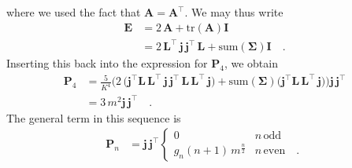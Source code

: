\documentclass[modern]{aastex62}
\begin{document}
    where we used the fact that $\mathbf{A} = \mathbf{A}^\top$. We may thus write
    \begin{align}
        \mathbf{E} & =
        2 \, \mathbf{A} + \mathrm{tr}(\mathbf{A}) \mathbf{I}
        \nonumber      \\
                   & =
        2 \, \mathbf{L}^\top \, \mathbf{j} \, \mathbf{j}^\top \, \mathbf{L} + \mathrm{sum}(\pmb{\Sigma}) \mathbf{I}
        \quad.
    \end{align}
    Inserting this back into the expression for $\mathbf{P}_4$, we obtain
    \begin{align}
        \mathbf{P}_4 & =
        \frac{5}{K^4}
        \bigg(
        2 \, \big(\mathbf{j}^\top \mathbf{L} \, \mathbf{L}^\top \, \mathbf{j} \, \mathbf{j}^\top \, \mathbf{L} \, \mathbf{L}^\top \, \mathbf{j} \big)
        +
        \mathrm{sum}(\pmb{\Sigma}) \big(\mathbf{j}^\top \mathbf{L} \, \mathbf{L}^\top \, \mathbf{j} \big)
        \bigg) \mathbf{j} \, \mathbf{j}^\top
        \nonumber        \\
                     & =
        3 \, m^2 \mathbf{j} \, \mathbf{j}^\top
        \quad.
    \end{align}
    The general term in this sequence is
    \begin{align}
        \mathbf{P}_n & =
        \mathbf{j} \, \mathbf{j}^\top
        \begin{cases}
            0                            & n \, \mathrm{odd}
            \\
            g_n (n + 1) \, m^\frac{n}{2} & n \, \mathrm{even}
            \quad.
        \end{cases}
    \end{align}
\end{document}
